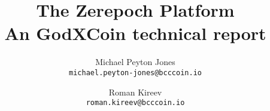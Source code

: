 \documentclass{article}
\theoremstyle{break}
\begin{document}
\title{The Zerepoch Platform \\
  {\large \sc An GodXCoin technical report}}
\date{}
\author{
  Michael Peyton Jones \\ {\small \texttt{michael.peyton-jones@bcccoin.io}} \\
  \and Roman Kireev \\ {\small \texttt{roman.kireev@bcccoin.io}}
}

\maketitle

\tableofcontents








\printglossaries
\glsaddall

\printbibliography[heading=bibintoc]
\end{document}
